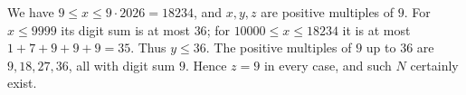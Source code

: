 We have $9\le x\le9\cdot2026=18234$, and $x,y,z$ are positive multiples of $9$. For $x\le9999$ its digit sum is at most $36$; for $10000\le x\le18234$ it is at most $1+7+9+9+9=35$. Thus $y\le36$. The positive multiples of $9$ up to $36$ are $9,18,27,36$, all with digit sum $9$. Hence $\boxed{z=9}$ in every case, and such $N$ certainly exist.
